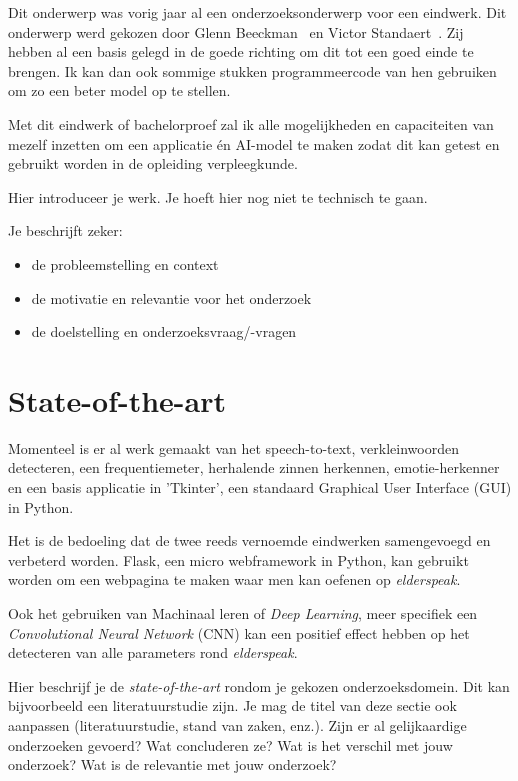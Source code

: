 Dit onderwerp was vorig jaar al een onderzoeksonderwerp voor een eindwerk. Dit onderwerp werd gekozen door Glenn Beeckman~\autocite{Beeckman2021} en Victor Standaert~\autocite{Standaert2021}. Zij hebben al een basis gelegd in de goede richting om dit tot een goed einde te brengen. Ik kan dan ook sommige stukken programmeercode van hen gebruiken om zo een beter model op te stellen.

Met dit eindwerk of bachelorproef zal ik alle mogelijkheden en capaciteiten van mezelf inzetten om een applicatie én AI-model te maken zodat dit kan getest en gebruikt worden in de opleiding verpleegkunde.


Hier introduceer je werk. Je hoeft hier nog niet te technisch te gaan.

Je beschrijft zeker:

\begin{itemize}
  \item de probleemstelling en context
  \item de motivatie en relevantie voor het onderzoek
  \item de doelstelling en onderzoeksvraag/-vragen
\end{itemize}


\section{State-of-the-art}
\label{sec:state-of-the-art}

Momenteel is er al werk gemaakt van het speech-to-text, verkleinwoorden detecteren, een frequentiemeter, herhalende zinnen herkennen, emotie-herkenner en een basis applicatie in 'Tkinter', een standaard Graphical User Interface (GUI) in Python.

Het is de bedoeling dat de twee reeds vernoemde eindwerken samengevoegd en verbeterd worden. Flask, een micro webframework in Python, kan gebruikt worden om een webpagina te maken waar men kan oefenen op \textit{elderspeak}.

Ook het gebruiken van Machinaal leren of \textit{Deep Learning}, meer specifiek een \textit{Convolutional Neural Network} (CNN) kan een positief effect hebben op het detecteren van alle parameters rond \textit{elderspeak}.


Hier beschrijf je de \emph{state-of-the-art} rondom je gekozen onderzoeksdomein. Dit kan bijvoorbeeld een literatuurstudie zijn. Je mag de titel van deze sectie ook aanpassen (literatuurstudie, stand van zaken, enz.). Zijn er al gelijkaardige onderzoeken gevoerd? Wat concluderen ze? Wat is het verschil met jouw onderzoek? Wat is de relevantie met jouw onderzoek?

